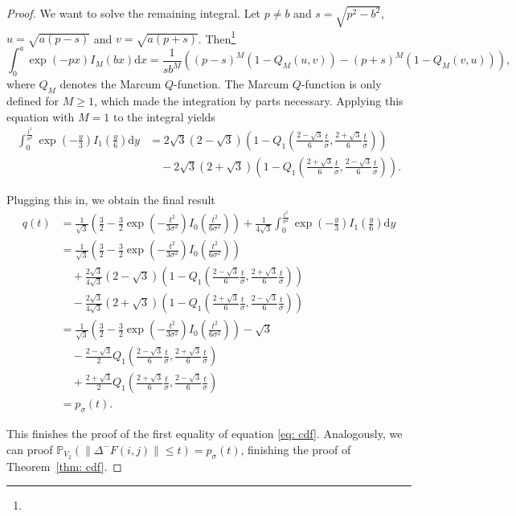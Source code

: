 \documentclass[a4paper,12pt]{article}
\newcommand{\norm}[1]{\lVert#1\rVert}
\theoremstyle{plain}
\theoremstyle{definition}
\begin{document}
\begin{proof}
	We want to solve the remaining integral. Let $p \neq b$ and $s = \sqrt{p^2 - b^2}$, $u = \sqrt{a (p - s)}$ and $v = \sqrt{a (p + s)}$. Then\footnote{}
	\begin{equation}\label{eq: intmarcum}
		\int_0^a \exp(-p x) I_M ( b x ) \mathrm{d}x = \frac{1}{s b^M} \left( (p - s)^M ( 1 - Q_M(u, v) ) - (p + s)^M ( 1 - Q_M(v, u) ) \right),
	\end{equation}
	where $Q_M$ denotes the Marcum $Q$-function. The Marcum $Q$-function is only defined for $M \geq 1$, which made the integration by parts necessary. Applying this equation with $M = 1$ to the integral yields
	\begin{align*}
		\int_0^\frac{t^2}{\sigma^2} \exp \left( - \frac{y}{3} \right) I_1 \left( \frac{y}{6} \right) \mathrm{d}y &= 2 \sqrt{3} (2 - \sqrt{3}) \left( 1 - Q_1 \left( \frac{2 - \sqrt{3}}{6} \frac{t}{\sigma}, \frac{2 + \sqrt{3}}{6} \frac{t}{\sigma} \right) \right) \\
		&\quad - 2 \sqrt{3} (2 + \sqrt{3}) \left( 1 - Q_1 \left( \frac{2 + \sqrt{3}}{6} \frac{t}{\sigma}, \frac{2 - \sqrt{3}}{6} \frac{t}{\sigma} \right) \right).
	\end{align*}
	
	Plugging this in, we obtain the final result
	\begin{align*}
		q(t) &= \frac{1}{\sqrt{3}} \left( \frac{3}{2} - \frac{3}{2} \exp \left( - \frac{t^2}{3 \sigma^2} \right) I_0 \left( \frac{t^2}{6 \sigma^2} \right) \right) + \frac{1}{4 \sqrt{3}} \int_0^\frac{t^2}{\sigma^2} \exp \left( - \frac{y}{3} \right) I_1 \left( \frac{y}{6} \right) \mathrm{d}y \\
		&= \frac{1}{\sqrt{3}} \left( \frac{3}{2} - \frac{3}{2} \exp \left( - \frac{t^2}{3 \sigma^2} \right) I_0 \left( \frac{t^2}{6 \sigma^2} \right) \right) \\
		&\quad + \frac{2 \sqrt{3}}{4 \sqrt{3}} (2 - \sqrt{3}) \left( 1 - Q_1 \left( \frac{2 - \sqrt{3}}{6} \frac{t}{\sigma}, \frac{2 + \sqrt{3}}{6} \frac{t}{\sigma} \right) \right) \\
		&\quad - \frac{2 \sqrt{3}}{4 \sqrt{3}} (2 + \sqrt{3}) \left( 1 - Q_1 \left( \frac{2 + \sqrt{3}}{6} \frac{t}{\sigma}, \frac{2 - \sqrt{3}}{6} \frac{t}{\sigma} \right) \right) \\
		&= \frac{1}{\sqrt{3}} \left( \frac{3}{2} - \frac{3}{2} \exp \left( - \frac{t^2}{3 \sigma^2} \right) I_0 \left( \frac{t^2}{6 \sigma^2} \right) \right) - \sqrt{3} \\
		&\quad - \frac{2 - \sqrt{3}}{2} Q_1 \left( \frac{2 - \sqrt{3}}{6} \frac{t}{\sigma}, \frac{2 + \sqrt{3}}{6} \frac{t}{\sigma} \right) \\
		&\quad + \frac{2 + \sqrt{3}}{2} Q_1 \left( \frac{2 + \sqrt{3}}{6} \frac{t}{\sigma}, \frac{2 - \sqrt{3}}{6} \frac{t}{\sigma} \right) \\
		&= p_\sigma(t).
	\end{align*}
	
	This finishes the proof of the first equality of equation \eqref{eq: cdf}. Analogously, we can proof $\mathbb{P}_{V_2}( \norm{\Delta^- F(i, j)} \leq t ) = p_\sigma(t)$, finishing the proof of Theorem~\ref{thm: cdf}.
\end{proof}
\end{document}
